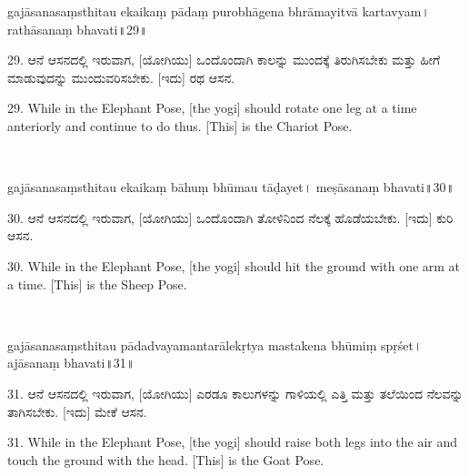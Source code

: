 \dummyimage
\begin{sans}
gajāsanasaṃsthitau ekaikaṃ pādaṃ purobhāgena bhrāmayitvā kartavyam। rathāsanaṃ bhavati॥29॥
\end{sans}
\bigskip

\begin{kan}
29.	ಆನೆ ಆಸನದಲ್ಲಿ ಇರುವಾಗ, [ಯೋಗಿಯು] ಒಂದೊಂದಾಗಿ ಕಾಲನ್ನು ಮುಂದಕ್ಕೆ ತಿರುಗಿಸಬೇಕು ಮತ್ತು ಹೀಗೆ ಮಾಡುವುದನ್ನು ಮುಂದುವರಿಸಬೇಕು. [ಇದು] ರಥ ಆಸನ.
\end{kan}
\bigskip

\begin{eng}
29. While in the Elephant Pose, [the yogi] should rotate one leg at a time anteriorly and continue to do thus. [This] is the Chariot Pose.
\end{eng}

\newpage

~\vskip 1cm

\dummyimage
\begin{sans}
gajāsanasaṃsthitau ekaikaṃ bāhuṃ bhūmau tāḍayet। meṣāsanaṃ bhavati॥30॥
\end{sans}
\bigskip

\begin{kan}
30.	ಆನೆ ಆಸನದಲ್ಲಿ ಇರುವಾಗ, [ಯೋಗಿಯು] ಒಂದೊಂದಾಗಿ ತೋಳಿನಿಂದ ನೆಲಕ್ಕೆ ಹೊಡೆಯಬೇಕು. [ಇದು] ಕುರಿ ಆಸನ.
\end{kan}
\bigskip

\begin{eng}
30. While in the Elephant Pose, [the yogi] should hit the ground with one arm at a time. [This] is the Sheep Pose.
\end{eng}

\newpage

~\vskip 1cm

\dummyimage
\begin{sans}
gajāsanasaṃsthitau pādadvayamantarālekṛtya mastakena bhūmiṃ spṛśet। ajāsanaṃ bhavati॥31॥
\end{sans}
\bigskip

\begin{kan}
31.	ಆನೆ ಆಸನದಲ್ಲಿ ಇರುವಾಗ, [ಯೋಗಿಯು] ಎರಡೂ ಕಾಲುಗಳನ್ನು ಗಾಳಿಯಲ್ಲಿ ಎತ್ತಿ ಮತ್ತು ತಲೆಯಿಂದ ನೆಲವನ್ನು ತಾಗಿಸಬೇಕು. [ಇದು] ಮೇಕೆ ಆಸನ.
\end{kan}
\bigskip

\begin{eng}
31. While in the Elephant Pose, [the yogi] should raise both legs into the air and  touch the ground with the head. [This] is the Goat Pose.
\end{eng}

\newpage

